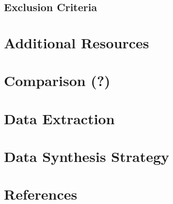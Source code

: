 \documentclass[
]{article}
\begin{document}
\hypertarget{exclusion-criteria}{%
\subsection{Exclusion Criteria}\label{exclusion-criteria}}

\hypertarget{additional-resources}{%
\section{Additional Resources}\label{additional-resources}}

\hypertarget{comparison}{%
\section{Comparison (?)}\label{comparison}}

\hypertarget{data-extraction}{%
\section{Data Extraction}\label{data-extraction}}

\hypertarget{data-synthesis-strategy}{%
\section{Data Synthesis Strategy}\label{data-synthesis-strategy}}

\hypertarget{references}{%
\section{References}\label{references}}
\end{document}
